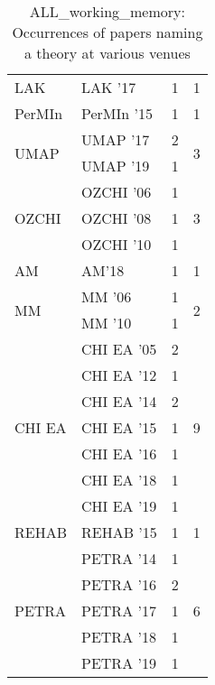 \begin{table*}[t]
\begin{tabular}{llrr}
\multirow{1}{*}{LAK } & LAK '17 & 1 & \multirow{1}{*}{1}\\
\multirow{1}{*}{PerMIn } & PerMIn '15 & 1 & \multirow{1}{*}{1}\\
\multirow{2}{*}{UMAP } & UMAP '17 & 2 & \multirow{2}{*}{3}\\
& UMAP '19 & 1 &\\
\multirow{3}{*}{OZCHI } & OZCHI '06 & 1 & \multirow{3}{*}{3}\\
& OZCHI '08 & 1 &\\
& OZCHI '10 & 1 &\\
\multirow{1}{*}{AM} & AM'18 & 1 & \multirow{1}{*}{1}\\
\multirow{2}{*}{MM } & MM '06 & 1 & \multirow{2}{*}{2}\\
& MM '10 & 1 &\\
\multirow{7}{*}{CHI EA } & CHI EA '05 & 2 & \multirow{7}{*}{9}\\
& CHI EA '12 & 1 &\\
& CHI EA '14 & 2 &\\
& CHI EA '15 & 1 &\\
& CHI EA '16 & 1 &\\
& CHI EA '18 & 1 &\\
& CHI EA '19 & 1 &\\
\multirow{1}{*}{REHAB } & REHAB '15 & 1 & \multirow{1}{*}{1}\\
\multirow{5}{*}{PETRA } & PETRA '14 & 1 & \multirow{5}{*}{6}\\
& PETRA '16 & 2 &\\
& PETRA '17 & 1 &\\
& PETRA '18 & 1 &\\
& PETRA '19 & 1 &\\
\end{tabular}
\caption{ALL\_working\_memory: Occurrences of papers naming a theory at various venues}
\end{table*}